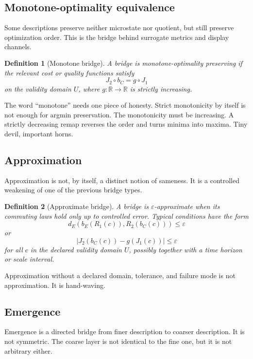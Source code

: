 \documentclass[11pt]{article}
\newtheorem{definition}{Definition}
\begin{document}
\subsection*{Monotone-optimality equivalence}

Some descriptions preserve neither microstate nor quotient, but still preserve optimization order. This is the bridge behind surrogate metrics and display channels.

\begin{definition}[Monotone bridge]
A bridge is monotone-optimality preserving if the relevant cost or quality functions satisfy
\[
J_2\circ b_C = g\circ J_1
\]
on the validity domain $U$, where $g:\mathbb{R}\to\mathbb{R}$ is strictly increasing.
\end{definition}

The word ``monotone'' needs one piece of honesty. Strict monotonicity by itself is not enough for argmin preservation. The monotonicity must be increasing. A strictly decreasing remap reverses the order and turns minima into maxima. Tiny devil, important horns.

\subsection*{Approximation}

Approximation is not, by itself, a distinct notion of sameness. It is a controlled weakening of one of the previous bridge types.

\begin{definition}[Approximate bridge]
A bridge is $\varepsilon$-approximate when its commuting laws hold only up to controlled error. Typical conditions have the form
\[
d_E\!\left(b_E(R_1(c)),R_2(b_C(c))\right)\le \varepsilon
\]
or
\[
|J_2(b_C(c)) - g(J_1(c))|\le \varepsilon
\]
for all $c$ in the declared validity domain $U$, possibly together with a time horizon or scale interval.
\end{definition}

Approximation without a declared domain, tolerance, and failure mode is not approximation. It is hand-waving.

\subsection*{Emergence}

Emergence is a directed bridge from finer description to coarser description. It is not symmetric. The coarse layer is not identical to the fine one, but it is not arbitrary either.
\end{document}
